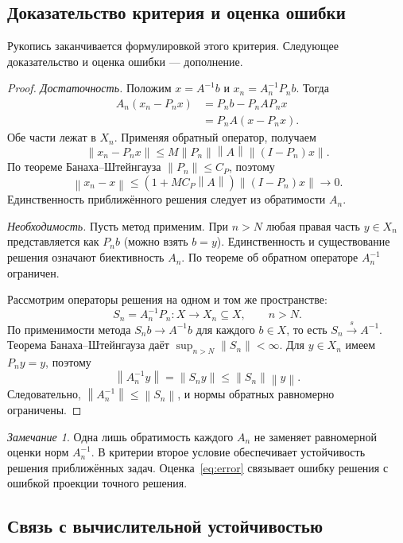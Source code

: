 \documentclass[12pt,a4paper]{article}
\theoremstyle{definition}
\theoremstyle{remark}
\newtheorem*{remark}{Замечание}
\newcommand{\norm}[1]{\left\lVert #1\right\rVert}
\begin{document}
\newpage
\subsection*{Доказательство критерия и оценка ошибки}

Рукопись заканчивается формулировкой этого критерия.
Следующее доказательство и оценка ошибки --- дополнение.

\begin{proof}
\emph{Достаточность.}
Положим $x=A^{-1}b$ и $x_n=A_n^{-1}P_nb$. Тогда
\begin{align*}
  A_n(x_n-P_nx)
  &=P_nb-P_nAP_nx\\
  &=P_nA(x-P_nx).
\end{align*}
Обе части лежат в $X_n$. Применяя обратный оператор, получаем
\[
  \norm{x_n-P_nx}
  \leqslant M\norm{P_n}\norm{A}\norm{(I-P_n)x}.
\]
По теореме Банаха--Штейнгауза $\norm{P_n}\leqslant C_P$, поэтому
\begin{equation}\label{eq:error}
  \boxed{\norm{x_n-x}
    \leqslant(1+MC_P\norm{A})\norm{(I-P_n)x}
    \longrightarrow0}.
\end{equation}
Единственность приближённого решения следует из обратимости $A_n$.

\emph{Необходимость.}
Пусть метод применим. При $n>N$ любая правая часть $y\in X_n$
представляется как $P_nb$ (можно взять $b=y$). Единственность
и существование решения означают биективность $A_n$.
По теореме об обратном операторе $A_n^{-1}$ ограничен.

Рассмотрим операторы решения на одном и том же пространстве:
\[
  S_n=A_n^{-1}P_n:X\to X_n\subseteq X,\qquad n>N.
\]
По применимости метода $S_nb\to A^{-1}b$ для каждого $b\in X$,
то есть $S_n\xrightarrow{s}A^{-1}$. Теорема Банаха--Штейнгауза
даёт $\sup_{n>N}\norm{S_n}<\infty$. Для $y\in X_n$
имеем $P_ny=y$, поэтому
\[
  \norm{A_n^{-1}y}=\norm{S_ny}\leqslant\norm{S_n}\norm{y}.
\]
Следовательно, $\norm{A_n^{-1}}\leqslant\norm{S_n}$,
и нормы обратных равномерно ограничены.
\end{proof}

\begin{remark}
Одна лишь обратимость каждого $A_n$ не заменяет равномерной оценки
норм $A_n^{-1}$. В критерии второе условие обеспечивает устойчивость
решения приближённых задач. Оценка~\eqref{eq:error} связывает
ошибку решения с ошибкой проекции точного решения.
\end{remark}

\subsection*{Связь с вычислительной устойчивостью}
\end{document}
